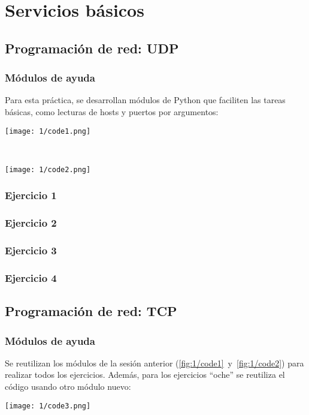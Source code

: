 \chapter{Servicios básicos}
\section{Programación de red: UDP}
\subsection{Módulos de ayuda}
Para esta práctica, se desarrollan módulos de Python que faciliten las tareas básicas,
como lecturas de hosts y puertos por argumentos: \\
\begin{minipage}{\linewidth}
	\centering
	\texttt{[image: 1/code1.png]}
	\label{fig:1/code1}
\end{minipage}
\\
\begin{minipage}{\linewidth}
	\centering
	\texttt{[image: 1/code2.png]}
	\label{fig:1/code2}
\end{minipage}

\subsection{Ejercicio 1}

\subsection{Ejercicio 2}

\subsection{Ejercicio 3}

\subsection{Ejercicio 4}

\section{Programación de red: TCP}
\subsection{Módulos de ayuda}
Se reutilizan los módulos de la sesión anterior (\ref{fig:1/code1}~y~\ref{fig:1/code2}) para
realizar todos los ejercicios. Además, para los ejercicios ``oche'' se reutiliza el código
usando otro módulo nuevo: \\
\begin{minipage}{\linewidth}
	\centering
	\texttt{[image: 1/code3.png]}
	\label{fig:1/code3}
\end{minipage}

